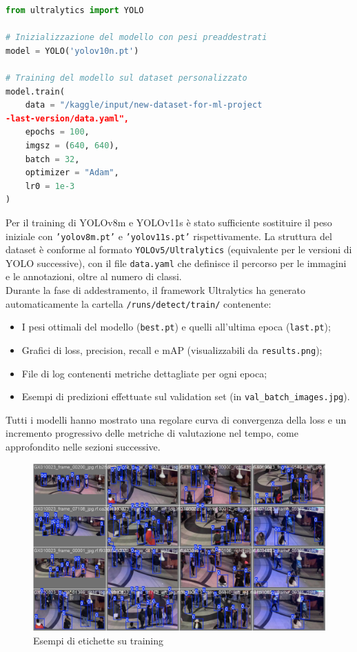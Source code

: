 \documentclass[12pt]{article}
\begin{document}
\begin{lstlisting}[language=Python, caption={Esempio di codice per il training di YOLOv10n}, label={lst:train-yolo}]
from ultralytics import YOLO

# Inizializzazione del modello con pesi preaddestrati
model = YOLO('yolov10n.pt')

# Training del modello sul dataset personalizzato
model.train(
    data = "/kaggle/input/new-dataset-for-ml-project
-last-version/data.yaml",
    epochs = 100,
    imgsz = (640, 640),
    batch = 32,
    optimizer = "Adam",
    lr0 = 1e-3
)
\end{lstlisting}
Per il training di YOLOv8m e YOLOv11s è stato sufficiente sostituire il peso iniziale con \texttt{'yolov8m.pt'} e \texttt{'yolov11s.pt'} rispettivamente. La struttura del dataset è conforme al formato \texttt{YOLOv5/Ultralytics} (equivalente per le versioni di YOLO successive), con il file \texttt{data.yaml} che definisce il percorso per le immagini e le annotazioni, oltre al numero di classi.\\
Durante la fase di addestramento, il framework Ultralytics ha generato automaticamente la cartella \texttt{/runs/detect/train/} contenente:

\begin{itemize}
    \item I pesi ottimali del modello (\texttt{best.pt}) e quelli all’ultima epoca (\texttt{last.pt});
    \item Grafici di loss, precision, recall e mAP (visualizzabili da \texttt{results.png});
    \item File di log contenenti metriche dettagliate per ogni epoca;
    \item Esempi di predizioni effettuate sul validation set (in \texttt{val\_batch\_images.jpg}).
\end{itemize}
Tutti i modelli hanno mostrato una regolare curva di convergenza della loss e un incremento progressivo delle metriche di valutazione nel tempo, come approfondito nelle sezioni successive.

\begin{figure}[H]
    \centering
    \includegraphics[width=1.00\textwidth]{./img/val_batch0_labels-yolov11s.jpg}
    \caption{Esempi di etichette su training}
    \label{fig:yolov11s-training-set}
\end{figure}
\end{document}
